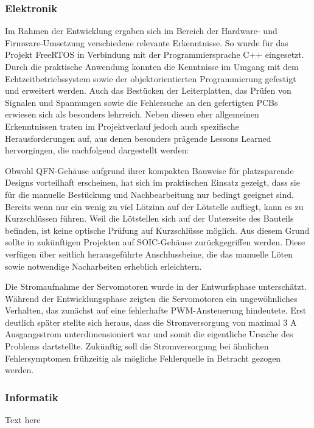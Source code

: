 \documentclass[main.tex]{subfiles} %
\begin{document}
\subsubsection{Elektronik}
Im Rahmen der Entwicklung ergaben sich im Bereich der Hardware- und Firmware-Umsetzung verschiedene relevante
Erkenntnisse. So wurde für das Projekt FreeRTOS in Verbindung mit der Programmiersprache C++ eingesetzt. Durch
die praktische Anwendung konnten die Kenntnisse im Umgang mit dem Echtzeitbetriebssystem sowie der objektorientierten
Programmierung gefestigt und erweitert werden. Auch das Bestücken der Leiterplatten, das Prüfen von Signalen
und Spannungen sowie die Fehlersuche an den gefertigten PCBs erwiesen sich als besonders lehrreich.
Neben diesen eher allgemeinen Erkenntnissen traten im Projektverlauf jedoch auch spezifische Herausforderungen auf,
aus denen besonders prägende Lessons Learned hervorgingen, die nachfolgend dargestellt werden:

Obwohl QFN-Gehäuse aufgrund ihrer kompakten Bauweise für platzsparende Designs
vorteilhaft erscheinen, hat sich im praktischen Einsatz gezeigt, dass sie für die manuelle Bestückung
und Nachbearbeitung nur bedingt geeignet sind. Bereits wenn nur ein wenig zu viel Lötzinn auf der
Lötstelle aufliegt, kann es zu Kurzschlüssen führen. Weil die Lötstellen sich auf der Unterseite des
Bauteils befinden, ist keine optische Prüfung auf Kurzschlüsse möglich. Aus diesem Grund sollte in
zukünftigen Projekten auf SOIC-Gehäuse zurückgegriffen werden. Diese verfügen über
seitlich herausgeführte Anschlussbeine, die das manuelle Löten sowie
notwendige Nacharbeiten erheblich erleichtern.

Die Stromaufnahme der Servomotoren wurde in der Entwurfsphase unterschätzt.
Während der Entwicklungsphase zeigten die Servomotoren ein ungewöhnliches Verhalten, das zunächst auf eine
fehlerhafte PWM-Ansteuerung hindeutete. Erst deutlich später stellte sich heraus, dass die Stromversorgung von
maximal 3 A Ausgangsstrom unterdimensioniert war und somit die eigentliche Ursache des Problems dartstellte.
Zukünftig soll die Stromversorgung bei ähnlichen Fehlersymptomen frühzeitig als mögliche Fehlerquelle in Betracht
gezogen werden.



\subsubsection{Informatik}

Text here
\end{document}

